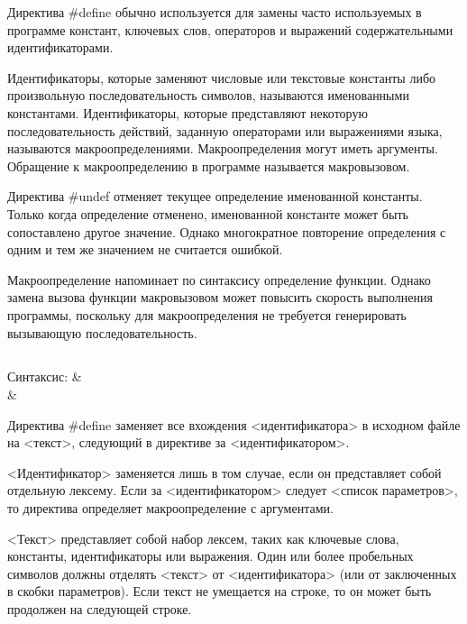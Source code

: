 Директива \#define обычно используется для замены часто используемых в программе констант, ключевых слов, операторов и выражений содержательными идентификаторами. \killoverfullbefore

Идентификаторы, которые заменяют числовые или текстовые константы либо произвольную последовательность символов, называются именованными константами. Идентификаторы, которые представляют некоторую последовательность действий, заданную операторами или выражениями языка, называются макроопределениями. Макроопределения могут иметь аргументы. Обращение к макроопределению в программе называется макровызовом.\killoverfullbefore

Директива \#undef отменяет текущее определение именованной константы. Только когда определение отменено, именованной константе может быть сопоставлено другое значение. Однако многократное повторение определения с одним и тем же значением не считается ошибкой.\killoverfullbefore

Макроопределение напоминает по синтаксису определение функции. Однако замена вызова функции макровызовом может повысить скорость выполнения программы, поскольку для макроопределения не требуется генерировать вызывающую последовательность.\killoverfullbefore
\subsection{}
\renewcommand{\arraystretch}{1.2} %
\renewcommand{\tabcolsep}{0.2cm}   %
\begin{pHeader}
Синтаксис:      & \\
                & \\    
\end{pHeader}

Директива \#define заменяет все вхождения <идентификатора> в исходном файле на <текст>, следующий в директиве за <идентификатором>. \killoverfullbefore

<Идентификатор> заменяется лишь в том случае, если он представляет собой отдельную лексему. Если за <идентификатором> следует <список параметров>, то директива определяет макроопределение с аргументами.\killoverfullbefore

<Текст> представляет собой набор лексем, таких как ключевые слова, константы, идентификаторы или выражения. Один или более пробельных символов должны отделять <текст> от <идентификатора> (или от заключенных в скобки параметров). Если текст не умещается на строке, то он может быть продолжен на следующей строке.\killoverfullbefore

